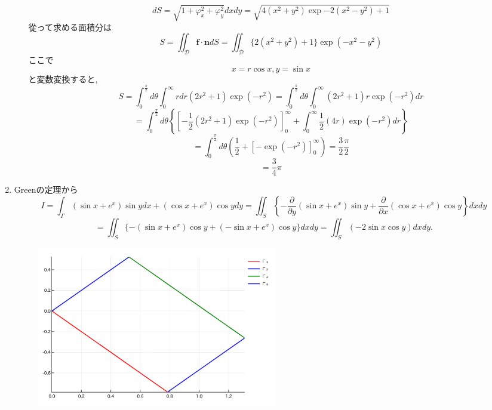 \documentclass[a4paper,10pt,report]{amsart}
\theoremstyle{plain}
\theoremstyle{definition}
\theoremstyle{remark}
\begin{document}
\begin{enumerate}
\begin{enumerate}
\begin{equation*}
                dS=\sqrt{1+\varphi_{x}^{2}+\varphi_{y}^{2}}dxdy=\sqrt{4(x^{2}+y^{2})\exp{-2(x^{2}-y^{2})}+1}
            \end{equation*}
            從って求める面積分は
            \begin{equation*}
            S=\iint_{\mathcal{D}}\bm{f}\cdot\bm{n}dS=\iint_{\mathcal{D}}\{2(x^{2}+y^{2})+1\}\exp(-x^{2}-y^{2})
            \end{equation*}
            ここで
            \begin{equation*}
                x=r\cos{x},y=\sin{x}
            \end{equation*}
            と変数変換すると, 
            \begin{equation*}
                S=\int_{0}^{\frac{\pi}{2}}d\theta\int_{0}^{\infty}rdr(2r^{2}+1)\exp{(-r^{2})}=\int_{0}^{\frac{\pi}{2}}d\theta\int_{0}^{\infty}(2r^{2}+1)r\exp(-r^{2})dr
            \end{equation*}
            \begin{equation*}
                =\int_{0}^{\frac{\pi}{2}}d\theta\left \{{\left[-\frac{1}{2}(2r^{2}+1)\exp(-r^{2})\right]}_{0}^{\infty}+\int_{0}^{\infty}\frac{1}{2}(4r)\exp(-r^{2})dr\right \}
            \end{equation*}
            \begin{equation*}
                =\int_{0}^{\frac{\pi}{2}}d\theta\left(\frac{1}{2}+{[-\exp(-r^{2})]}_{0}^{\infty}\right)=\frac{3}{2}\frac{\pi}{2}
            \end{equation*}
            \begin{equation*}
                =\frac{3}{4}\pi
            \end{equation*}
        \end{enumerate}
        \item Greenの定理から
        \begin{equation*}
            I=\int_{\Gamma}(\sin{x}+e^{x})\sin{y}dx+(\cos{x}+e^{x})\cos{y}dy=\iint_{S}\left \{-\frac{\partial}{\partial y}(\sin{x}+e^{x})\sin{y}+\frac{\partial}{\partial x}(\cos{x}+e^{x})\cos{y}\right \}dxdy
        \end{equation*}
        \begin{equation*}
            =\iint_{S}\{-(\sin{x}+e^{x})\cos{y}+(-\sin{x}+e^{x})\cos{y}\}dxdy=\iint_{S}(-2\sin{x}\cos{y})dxdy. 
        \end{equation*}
        \begin{figure}[tbh]
            \centering
            \includegraphics[height=7cm]{plot_gamma.png}

\end{figure}
\end{enumerate}
\end{document}
